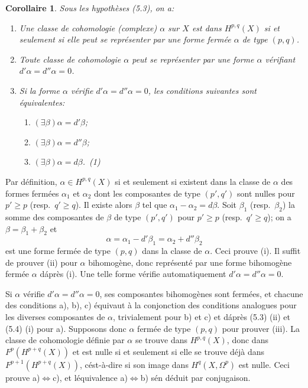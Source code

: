 \documentclass[12pt]{amsart}
\theoremstyle{plain}
\newtheorem{cor}[prop]{Corollaire}
\theoremstyle{remark}
\begin{document}
\begin{cor}\label{cor:5.4}
Sous les hypoth\`eses (5.3), on a:
\begin{enumerate}
\item[(i)] Une classe de cohomologie (complexe) $\alpha$ sur $X$ est dans $H^{p,q}(X)$ si et seulement si elle peut se repr\'esenter par une forme ferm\'ee $\alpha$ de type $(p, q)$.
\item[(ii)] Toute classe de cohomologie $\alpha$ peut se repr\'esenter par une forme $\alpha$ v\'erifiant $d'\alpha = d''\alpha = 0$.
\item[(iii)] Si la forme $\alpha$ v\'erifie $d'\alpha = d''\alpha = 0$, les conditions suivantes sont \'equivalentes:
\begin{enumerate}
\item[(a)] $(\exists \beta) \alpha = d'\beta$;
\item[(b)] $(\exists \beta) \alpha = d''\beta$;
\item[(c)] $(\exists \beta) \alpha = d\beta$.~(1)
\end{enumerate}
\end{enumerate}
\end{cor}


Par d\'efinition, $\alpha \in H^{p,q}(X)$ si et seulement si existent dans la classe de $\alpha$ des formes ferm\'ees $\alpha_1$ et $\alpha_2$ dont les composantes de type $(p', q')$ sont nulles pour $p' \geq p$ (resp.~$q' \geq q$). Il existe alors $\beta$ tel que $\alpha_1 - \alpha_2 = d\beta$. Soit $\beta_1$ (resp.~$\beta_2$) la somme des composantes de $\beta$ de type $(p', q')$ pour $p' \geq p$ (resp.~$q' \geq q$); on a $\beta = \beta_1 + \beta_2$ et
\[
\alpha = \alpha_1 - d'\beta_1 = \alpha_2 + d''\beta_2
\]
est une forme ferm\'ee de type $(p, q)$ dans la classe de $\alpha$. Ceci prouve (i). Il suffit de prouver (ii) pour $\alpha$ bihomog\`ene, donc repr\'esent\'e par une forme bihomog\`ene ferm\'ee $\alpha$ d\'apr\`es (i). Une telle forme v\'erifie automatiquement $d'\alpha = d''\alpha = 0$.

Si $\alpha$ v\'erifie $d'\alpha = d''\alpha = 0$, ses composantes bihomog\`enes sont ferm\'ees, et chacune des conditions a), b), c) \'equivaut \`a la conjonction des conditions analogues pour les diverses composantes de $\alpha$, trivialement pour b) et c) et d\'apr\`es (5.3) (ii) et (5.4) (i) pour a). Supposons donc $\alpha$ ferm\'ee de type $(p, q)$ pour prouver (iii). La classe de cohomologie d\'efinie par $\alpha$ se trouve dans $H^{p,q}(X)$, donc dans $F^p(H^{p+q}(X))$ et est nulle si et seulement si elle se trouve d\'ej\`a dans $F^{p+1}(H^{p+q}(X))$, c\'est-\`a-dire si son image dans $H^q(X, \Omega^p)$ est nulle. Ceci prouve a)$\Leftrightarrow$c), et l\'equivalence a)$\Leftrightarrow$b) s\'en d\'eduit par conjugaison.
\end{document}
